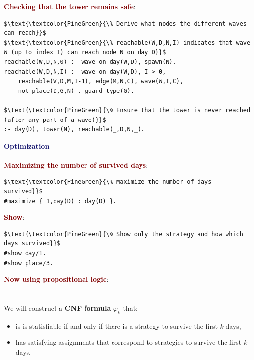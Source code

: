 \newpage

{\Large \textbf{\textcolor{Maroon}{Checking that the tower remains safe}}:}
\begin{lstlisting}
$\text{\textcolor{PineGreen}{\% Derive what nodes the different waves can reach}}$
$\text{\textcolor{PineGreen}{\% reachable(W,D,N,I) indicates that wave W (up to index I) can reach node N on day D}}$
reachable(W,D,N,0) :- wave_on_day(W,D), spawn(N).
reachable(W,D,N,I) :- wave_on_day(W,D), I > 0,
    reachable(W,D,M,I-1), edge(M,N,C), wave(W,I,C),
    not place(D,G,N) : guard_type(G).

$\text{\textcolor{PineGreen}{\% Ensure that the tower is never reached (after any part of a wave)}}$
:- day(D), tower(N), reachable(_,D,N,_).
\end{lstlisting}

\vspace{1cm}

{\Huge \textbf{\textcolor{MidnightBlue}{Optimization}}} \\
\\
{\Large \textbf{\textcolor{Maroon}{Maximizing the number of survived days}}:}
\begin{lstlisting}
$\text{\textcolor{PineGreen}{\% Maximize the number of days survived}}$
#maximize { 1,day(D) : day(D) }.
\end{lstlisting}

\vspace{0.5cm}

{\Large \textbf{\textcolor{Maroon}{Show}}:}
\begin{lstlisting}
$\text{\textcolor{PineGreen}{\% Show only the strategy and how which days survived}}$
#show day/1.
#show place/3.
\end{lstlisting}

\newpage

{\Huge \textbf{\textcolor{Maroon}{Now using propositional logic}}:} \\
\\
\\
We will construct a \textbf{CNF formula $\varphi_k$} that:
\begin{itemize}
    \setlength\itemsep{0em}
    \item is \textcolor{NavyBlue}{is statisfiable} if and only if there is a strategy to survive the first $k$ days,
    \item has satisfying assignments that correspond to strategies to survive the first $k$ days.
\end{itemize}


